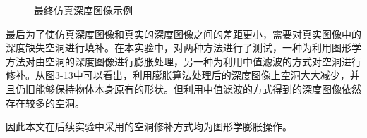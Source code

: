 \begin{figure}[htb]
{%
}
\hspace{0.01\linewidth}
\caption{最终仿真深度图像示例}
\end{figure}

最后为了使仿真深度图像和真实的深度图像之间的差距更小，需要对真实图像中的深度缺失空洞进行填补。在本实验中，对两种方法进行了测试，一种为利用图形学方法对由空洞的深度图像进行膨胀处理，另一种为利用中值滤波的方式对空洞进行修补。从图3-13中可以看出，利用膨胀算法处理后的深度图像上空洞大大减少，并且仍旧能够保持物体本身原有的形状。但利用中值滤波的方式得到的深度图像依然存在较多的空洞。

因此本文在后续实验中采用的空洞修补方式均为图形学膨胀操作。

